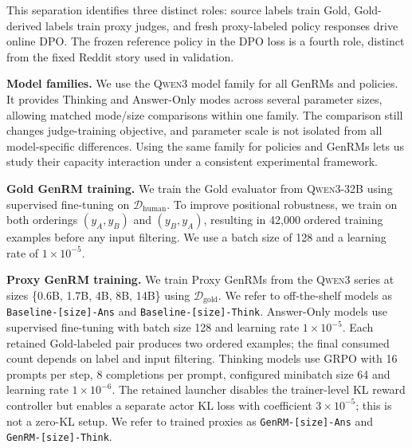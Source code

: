 \documentclass[11pt,letterpaper]{article}
\begin{document}
This separation identifies three distinct roles: source labels train Gold, Gold-derived labels train proxy judges, and fresh proxy-labeled policy responses drive online DPO. The frozen reference policy in the DPO loss is a fourth role, distinct from the fixed Reddit story used in validation.

\textbf{Model families.} We use the \textsc{Qwen3} model family for all GenRMs and policies. It provides Thinking and Answer-Only modes across several parameter sizes, allowing matched mode/size comparisons within one family. The comparison still changes judge-training objective, and parameter scale is not isolated from all model-specific differences. Using the same family for policies and GenRMs lets us study their capacity interaction under a consistent experimental framework.

\textbf{Gold GenRM training.} We train the Gold evaluator from \textsc{Qwen3-32B} using supervised fine-tuning on $\mathcal{D}_{\text{human}}$. To improve positional robustness, we train on both orderings $(y_A, y_B)$ and $(y_B, y_A)$, resulting in 42{,}000 ordered training examples before any input filtering. We use a batch size of 128 and a learning rate of $1 \times 10^{-5}$.

\textbf{Proxy GenRM training.} We train Proxy GenRMs from the \textsc{Qwen3} series at sizes \{0.6B, 1.7B, 4B, 8B, 14B\} using $\mathcal{D}_{\text{gold}}$. We refer to off-the-shelf models as \texttt{Baseline-[size]-Ans} and \texttt{Baseline-[size]-Think}. Answer-Only models use supervised fine-tuning with batch size 128 and learning rate $1 \times 10^{-5}$. Each retained Gold-labeled pair produces two ordered examples; the final consumed count depends on label and input filtering. Thinking models use GRPO with 16 prompts per step, 8 completions per prompt, configured minibatch size 64 and learning rate $1 \times 10^{-6}$. The retained launcher disables the trainer-level KL reward controller but enables a separate actor KL loss with coefficient $3\times10^{-5}$; this is not a zero-KL setup. We refer to trained proxies as \texttt{GenRM-[size]-Ans} and \texttt{GenRM-[size]-Think}.
\end{document}
